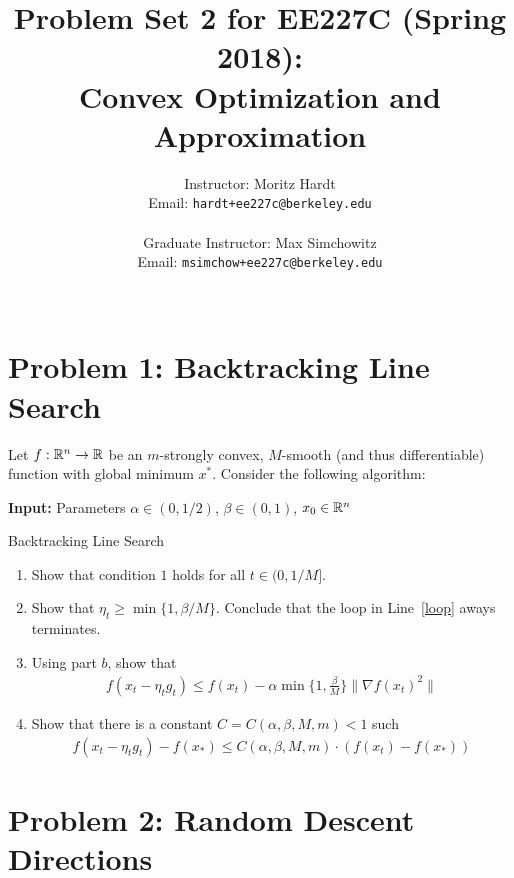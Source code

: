 \documentclass[12pt]{article}
\title{Problem Set 2 for EE227C (Spring 2018):\\
 Convex Optimization and Approximation }
\author{Instructor: Moritz Hardt\\
{\small Email: \tt hardt+ee227c@berkeley.edu}\\ ~\\
Graduate Instructor: Max Simchowitz\\
{\small Email: \tt msimchow+ee227c@berkeley.edu}\\ ~\\
}
\begin{document}


\maketitle

\section*{Problem 1: Backtracking Line Search}
	Let $f: \mathbb{R}^n \to \mathbb{R}$ be an $m$-strongly convex, $M$-smooth (and thus differentiable) function with global minimum $x^*$. Consider the following algorithm: 

	\begin{algorithm}[H]
	\SetAlgoLined
	\textbf{Input:} Parameters $\alpha \in (0,1/2)$, $\beta \in (0,1)$, $x_0 \in \mathbb{R}^n$\;
	\caption{Backtracking Line Search}
	\end{algorithm}

	\begin{enumerate}
		\item Show that condition $1$ holds for all $t \in (0,1/M]$.
		\item Show that $\eta_t \ge \min\{1,\beta/M\}$.
		 Conclude that the loop in Line~\ref{loop} aways terminates.
		\item Using part $b$, show that 
		\begin{eqnarray}
		f(x_t - \eta_t g_t) \le f(x_t) - \alpha \min\{1,\frac{\beta}{M}\}\|\nabla f(x_t)^2\|
		\end{eqnarray}
		\item Show that there is a constant $C = C(\alpha,\beta,M,m) < 1$ such 
		\begin{eqnarray}
		f(x_t - \eta_t g_t) - f(x_*) \le C(\alpha,\beta,M,m) \cdot (f(x_t) - f(x_*))
		\end{eqnarray}
	\end{enumerate}


\section*{Problem 2: Random Descent Directions}
\end{document}
